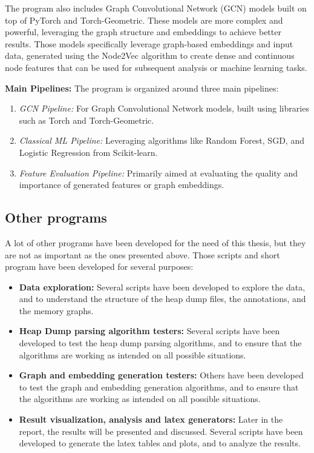 The program also includes Graph Convolutional Network (GCN) models built on top of PyTorch and Torch-Geometric. These models are more complex and powerful, leveraging the graph structure and embeddings to achieve better results. Those models specifically leverage graph-based embeddings and input data, generated using the Node2Vec algorithm to create dense and continuous node features that can be used for subsequent analysis or machine learning tasks.

\textbf{Main Pipelines:}
The program is organized around three main pipelines:
\begin{enumerate}
    \item \textit{GCN Pipeline:} For Graph Convolutional Network models, built using libraries such as Torch and Torch-Geometric.
    \item \textit{Classical ML Pipeline:} Leveraging algorithms like Random Forest, SGD, and Logistic Regression from Scikit-learn.
    \item \textit{Feature Evaluation Pipeline:} Primarily aimed at evaluating the quality and importance of generated features or graph embeddings.
\end{enumerate}

\subsection{Other programs}
A lot of other programs have been developed for the need of this thesis, but they are not as important as the ones presented above. Those scripts and short program have been developed for several purposes:

\begin{itemize}
    \item \textbf{Data exploration:} Several scripts have been developed to explore the data, and to understand the structure of the heap dump files, the annotations, and the memory graphs.
    \item \textbf{Heap Dump parsing algorithm testers:} Several scripts have been developed to test the heap dump parsing algorithms, and to ensure that the algorithms are working as intended on all possible situations.
    \item \textbf{Graph and embedding generation testers:} Others have been developed to test the graph and embedding generation algorithms, and to ensure that the algorithms are working as intended on all possible situations.
    \item \textbf{Result visualization, analysis and latex generators:} Later in the report, the results will be presented and discussed. Several scripts have been developed to generate the latex tables and plots, and to analyze the results.
\end{itemize}

